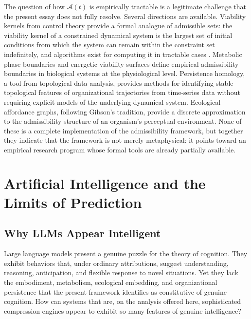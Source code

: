 \documentclass[12pt,a4paper]{report}
\theoremstyle{flyxion}
\begin{document}
The question of how $\mathcal{A}(t)$ is empirically tractable is a legitimate challenge that the present essay does not fully resolve. Several directions are available. Viability kernels from control theory provide a formal analogue of admissible sets: the viability kernel of a constrained dynamical system is the largest set of initial conditions from which the system can remain within the constraint set indefinitely, and algorithms exist for computing it in tractable cases \cite{aubin}. Metabolic phase boundaries and energetic viability surfaces define empirical admissibility boundaries in biological systems at the physiological level. Persistence homology, a tool from topological data analysis, provides methods for identifying stable topological features of organizational trajectories from time-series data without requiring explicit models of the underlying dynamical system. Ecological affordance graphs, following Gibson's tradition, provide a discrete approximation to the admissibility structure of an organism's perceptual environment. None of these is a complete implementation of the admissibility framework, but together they indicate that the framework is not merely metaphysical: it points toward an empirical research program whose formal tools are already partially available.

\chapter{Artificial Intelligence and the Limits of Prediction}

\section{Why LLMs Appear Intelligent}

Large language models present a genuine puzzle for the theory of cognition. They exhibit behaviors that, under ordinary attributions, suggest understanding, reasoning, anticipation, and flexible response to novel situations. Yet they lack the embodiment, metabolism, ecological embedding, and organizational persistence that the present framework identifies as constitutive of genuine cognition. How can systems that are, on the analysis offered here, sophisticated compression engines appear to exhibit so many features of genuine intelligence?
\end{document}
